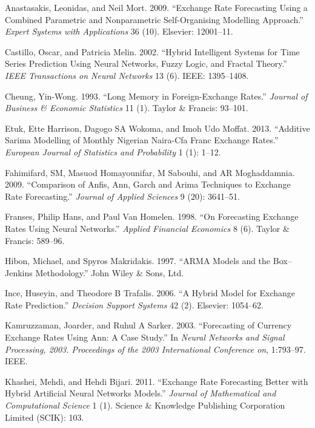 \documentclass[12pt,preprint, authoryear]{elsarticle}
\numberwithin{equation}{section}
\numberwithin{figure}{section}
\numberwithin{table}{section}
\begin{document}
\hypertarget{ref-anastasakis2009}{}
Anastasakis, Leonidas, and Neil Mort. 2009. ``Exchange Rate Forecasting
Using a Combined Parametric and Nonparametric Self-Organising Modelling
Approach.'' \emph{Expert Systems with Applications} 36 (10). Elsevier:
12001--11.

\hypertarget{ref-castillo2002}{}
Castillo, Oscar, and Patricia Melin. 2002. ``Hybrid Intelligent Systems
for Time Series Prediction Using Neural Networks, Fuzzy Logic, and
Fractal Theory.'' \emph{IEEE Transactions on Neural Networks} 13 (6).
IEEE: 1395--1408.

\hypertarget{ref-cheung1993}{}
Cheung, Yin-Wong. 1993. ``Long Memory in Foreign-Exchange Rates.''
\emph{Journal of Business \& Economic Statistics} 11 (1). Taylor \&
Francis: 93--101.

\hypertarget{ref-etuk2013}{}
Etuk, Ette Harrison, Dagogo SA Wokoma, and Imoh Udo Moffat. 2013.
``Additive Sarima Modelling of Monthly Nigerian Naira-Cfa Franc Exchange
Rates.'' \emph{European Journal of Statistics and Probability} 1 (1):
1--12.

\hypertarget{ref-fahimifard2009}{}
Fahimifard, SM, Masuod Homayounifar, M Sabouhi, and AR Moghaddamnia.
2009. ``Comparison of Anfis, Ann, Garch and Arima Techniques to Exchange
Rate Forecasting.'' \emph{Journal of Applied Sciences} 9 (20): 3641--51.

\hypertarget{ref-franses1998}{}
Franses, Philip Hans, and Paul Van Homelen. 1998. ``On Forecasting
Exchange Rates Using Neural Networks.'' \emph{Applied Financial
Economics} 8 (6). Taylor \& Francis: 589--96.

\hypertarget{ref-spyros1997}{}
Hibon, Michael, and Spyros Makridakis. 1997. ``ARMA Models and the
Box--Jenkins Methodology.'' John Wiley \& Sons, Ltd.

\hypertarget{ref-ince2006}{}
Ince, Huseyin, and Theodore B Trafalis. 2006. ``A Hybrid Model for
Exchange Rate Prediction.'' \emph{Decision Support Systems} 42 (2).
Elsevier: 1054--62.

\hypertarget{ref-kamruzzaman2003}{}
Kamruzzaman, Joarder, and Ruhul A Sarker. 2003. ``Forecasting of
Currency Exchange Rates Using Ann: A Case Study.'' In \emph{Neural
Networks and Signal Processing, 2003. Proceedings of the 2003
International Conference on}, 1:793--97. IEEE.

\hypertarget{ref-khashei2011}{}
Khashei, Mehdi, and Hehdi Bijari. 2011. ``Exchange Rate Forecasting
Better with Hybrid Artificial Neural Networks Models.'' \emph{Journal of
Mathematical and Computational Science} 1 (1). Science \& Knowledge
Publishing Corporation Limited (SCIK): 103.
\end{document}
